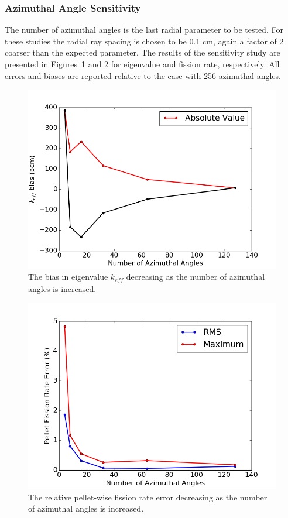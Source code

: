 \newpage
\subsubsection{Azimuthal Angle Sensitivity}

The number of azimuthal angles is the last radial parameter to be tested. For these studies the radial ray spacing is chosen to be 0.1 cm, again a factor of 2 coarser than the expected parameter. The results of the sensitivity study are presented in Figures~\ref{fig:az-angles-pcm} and \ref{fig:az-angles-fr} for eigenvalue and fission rate, respectively. All errors and biases are reported relative to the case with 256 azimuthal angles.

\begin{figure}[h!]
	\centering
	\includegraphics[width=0.7\linewidth]{figures/results/sensitivity/az_angles_pcm.png}
	\caption[]{The bias in eigenvalue $k_{\textit{eff}}$ decreasing as the number of azimuthal angles is increased.}
	\label{fig:az-angles-pcm}
\end{figure}
\begin{figure}[h!]
	\centering
	\includegraphics[width=0.7\linewidth]{figures/results/sensitivity/az_angles_fr_new.png}
	\caption[]{The relative pellet-wise fission rate error decreasing as the number of azimuthal angles is increased.}
	\label{fig:az-angles-fr}
\end{figure}

